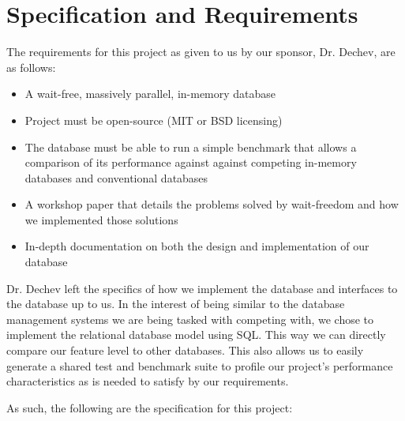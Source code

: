 \documentclass[letterpaper, 11pt]{article}
\begin{document}
\section{Specification and Requirements}
The requirements for this project as given to us by our sponsor, Dr. Dechev, are as follows:
\begin{itemize}
 \item A wait-free, massively parallel, in-memory database
 \item Project must be open-source (MIT or BSD licensing)
 \item The database must be able to run a simple benchmark that allows a comparison of its performance against
 against competing in-memory databases and conventional databases
 \item A workshop paper that details the problems solved by wait-freedom and how we
 implemented those solutions
 \item In-depth documentation on both the design and implementation of our database
\end{itemize}
\par\vspace{\baselineskip}
Dr. Dechev left the specifics of how we implement the database and interfaces to the database
up to us. In the interest of being similar to the database management systems we are being
tasked with competing with, we chose to implement the relational database model using SQL. This way we
can directly compare our feature level to other databases. This also allows us to easily generate
a shared test and benchmark suite to profile our project's performance characteristics as is needed
to satisfy by our requirements.
\par\vspace{\baselineskip}
As such, the following are the specification for this project:
\end{document}
